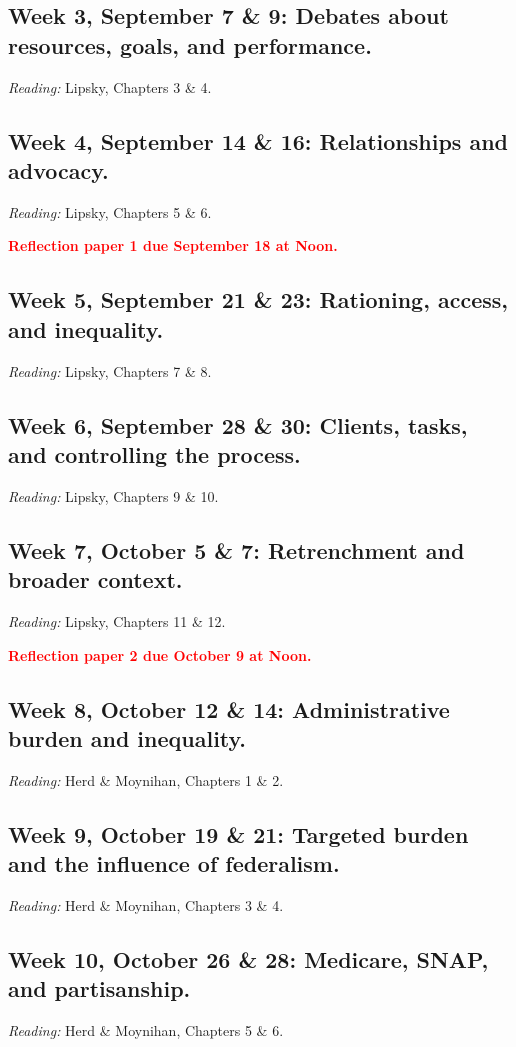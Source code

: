 \documentclass[a4paper,12pt]{article}
\begin{document}
\subsection*{Week 3, September 7 \& 9: Debates about resources, goals, and performance.}
\emph{Reading:} Lipsky, Chapters 3 \& 4.

\subsection*{Week 4, September 14 \& 16:  Relationships and advocacy.}
\emph{Reading:} Lipsky, Chapters 5 \& 6.

\textcolor{red}{\textbf{Reflection paper 1 due September 18 at Noon.}}

\subsection*{Week 5, September 21 \& 23:  Rationing, access, and inequality.}
\emph{Reading:} Lipsky, Chapters 7 \& 8.

\subsection*{Week 6, September 28 \& 30:  Clients, tasks, and controlling the process.}
\emph{Reading:} Lipsky, Chapters 9 \& 10.

\subsection*{Week 7, October 5 \& 7:  Retrenchment and broader context.}
\emph{Reading:} Lipsky, Chapters 11 \& 12.

\textcolor{red}{\textbf{Reflection paper 2 due October 9 at Noon.}}

\subsection*{Week 8, October 12 \& 14:  Administrative burden and inequality.}
\emph{Reading:} Herd \& Moynihan, Chapters 1 \& 2.

\subsection*{Week 9, October 19 \& 21:  Targeted burden and the influence of federalism.}
\emph{Reading:} Herd \& Moynihan, Chapters 3 \& 4.

\subsection*{Week 10, October 26 \& 28:  Medicare, SNAP, and partisanship.}
\emph{Reading:} Herd \& Moynihan, Chapters 5 \& 6.
\end{document}
